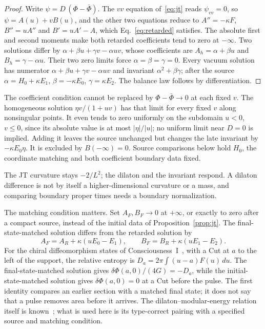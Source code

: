 \begin{proof}
Write $\psi=D\,(\Phi-\bar\Phi)$. The $vv$ equation of~\eqref{eq:jt} reads $\psi_{vv}=0$, so $\psi=A(u)+vB(u)$, and the other two equations reduce to $A''=-\kappa F$, $B''=uA''$ and $B'=uA'-A$, which Eq.~\eqref{eq:retarded} satisfies. The absolute first and second moments make both retarded coefficients tend to zero at $-\infty$. Two solutions differ by $\alpha+\beta u+\gamma v-\alpha uv$, whose coefficients are $A_h=\alpha+\beta u$ and $B_h=\gamma-\alpha u$. Their two zero limits force $\alpha=\beta=\gamma=0$. Every vacuum solution has numerator $\alpha+\beta u+\gamma v-\alpha uv$ and invariant $\alpha^2+\beta\gamma$; after the source $\alpha=H_0+\kappa E_1$, $\beta=-\kappa E_0$, $\gamma=\kappa E_2$. The balance law follows by differentiation. 
\end{proof}

The coefficient condition cannot be replaced by $\Phi-\bar\Phi\to0$ at each fixed $v$. The homogeneous solution $\eta v/(1+uv)$ has that limit for every fixed $v$ along nonsingular points. It even tends to zero uniformly on the subdomain $u<0$, $v\le0$, since its absolute value is at most $|\eta|/|u|$; no uniform limit near $D=0$ is implied. Adding it leaves the source unchanged but changes the late invariant by $-\kappa E_0\eta$. It is excluded by $B(-\infty)=0$. Source comparisons below hold $H_0$, the coordinate matching and both coefficient boundary data fixed.

The JT curvature stays $-2/L^2$; the dilaton and the invariant respond. A dilaton difference is not by itself a higher-dimensional curvature or a mass, and comparing boundary proper times needs a boundary normalization.

The matching condition matters. Set $A_F,B_F\to0$ at $+\infty$, or exactly to zero after a compact source, instead of the initial data of Proposition~\ref{prop:jt}. The final-state-matched solution differs from the retarded solution by
\[
A_F=A_R+\kappa(uE_0-E_1),\qquad
B_F=B_R+\kappa(uE_1-E_2).
\]
For the chiral diffeomorphism states of Consciousness~I~\cite{PaperCI}, with a Cut at $a$ to the left of the support, the relative entropy is $D_a=2\pi\int(u-a)F(u)\,du$. The final-state-matched solution gives $\delta\Phi(a,0)/(4G)=-D_a$, while the initial-state-matched solution gives $\delta\Phi(a,0)=0$ at a Cut before the pulse. The first identity compares an earlier section with a matched final state; it does not say that a pulse removes area before it arrives. The dilaton--modular-energy relation itself is known~\cite{Callebaut2019}; what is used here is its type-correct pairing with a specified source and matching condition.

